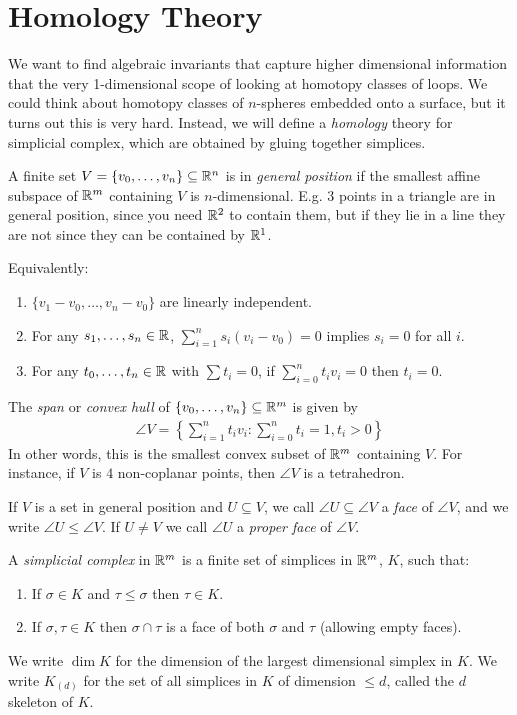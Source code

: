 \documentclass[10pt,a4paper]{article}
\begin{document}
\section{Homology Theory}
We want to find algebraic invariants that capture higher dimensional information that the very 1-dimensional scope of looking at homotopy classes of loops. We could think about homotopy classes of $n$-spheres embedded onto a surface, but it turns out this is very hard. Instead, we will define a \emph{homology} theory for simplicial complex, which are obtained by gluing together simplices.

A finite set $V = \{v_0, \ldots, v_n\} \subseteq \mathbb{R}^n$ is in \emph{general position} if the smallest affine subspace of $\mathbb{R}^m$ containing $V$ is $n$-dimensional. E.g. 3 points in a triangle are in general position, since you need $\mathbb{R}^2$ to contain them, but if they lie in a line they are not since they can be contained by $\mathbb{R}^1$.

Equivalently:
\begin{enumerate}
\item $\{v_1-v_0, \ldots, v_n-v_0\}$ are linearly independent.
\item For any $s_1, \ldots, s_n \in \mathbb{R}$, $\sum_{i=1}^n s_i(v_i-v_0) = 0$ implies $s_i = 0$ for all $i$.
\item For any $t_0, \ldots, t_n \in \mathbb{R}$ with $\sum t_i = 0$, if $\sum_{i=0}^n t_iv_i = 0$ then $t_i = 0$.
\end{enumerate}

The \emph{span} or \emph{convex hull} of $\{v_0, \ldots, v_n\} \subseteq \mathbb{R}^m$ is given by
\begin{align*}
\angle{V} = \left\{\sum_{i=1}^n t_iv_i : \sum_{i=0}^n t_i = 1, t_i > 0 \right\}
\end{align*}
In other words, this is the smallest convex subset of $\mathbb{R}^m$ containing $V$. For instance, if $V$ is $4$ non-coplanar points, then $\angle{V}$ is a tetrahedron.

If $V$ is a set in general position and $U \subseteq V$, we call $\angle{U}\subseteq \angle{V}$ a \emph{face} of $\angle{V}$, and we write $\angle{U}\leq \angle{V}$. If $U \neq V$ we call $\angle{U}$ a \emph{proper face} of $\angle{V}$.

A \emph{simplicial complex} in $\mathbb{R}^m$ is a finite set of simplices in $\mathbb{R}^m$, $K$, such that:
\begin{enumerate}
\item If $\sigma \in K$ and $\tau \leq \sigma$ then $\tau \in K$.
\item If $\sigma, \tau \in K$ then $\sigma \cap \tau$ is a face of both $\sigma$ and $\tau$ (allowing empty faces).
\end{enumerate}
We write $\dim K$ for the dimension of the largest dimensional simplex in $K$. We write $K_{(d)}$ for the set of all simplices in $K$ of dimension $\leq d$, called the $d$ skeleton of $K$.
\end{document}
